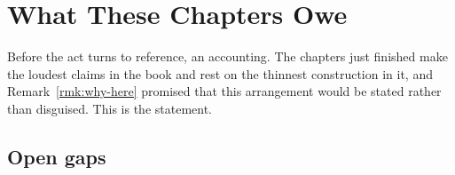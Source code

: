 \chapter{What These Chapters Owe}
\label{sec:hyper-gaps}

Before the act turns to reference, an accounting.
The chapters just finished make the loudest claims in the book and rest
on the thinnest construction in it, and
Remark~\ref{rmk:why-here} promised that this arrangement would be stated
rather than disguised.
This is the statement.

\section{Open gaps}

